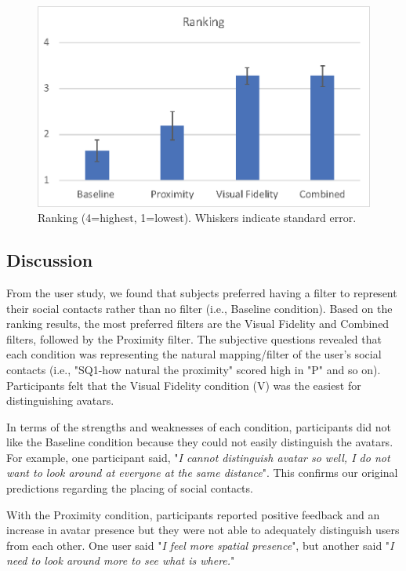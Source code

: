 \begin{figure}[ht]
    \centering
    \includegraphics[width=0.8\linewidth]{images/mgia17/analysis-images-04.eps}
    \caption{Ranking (4=highest, 1=lowest). Whiskers indicate standard error.}
    \label{fig:contacts:ranking}
\end{figure}

\subsection{Discussion}

From the user study, we found that subjects preferred having a filter to represent their social contacts rather than no filter (i.e., Baseline condition). Based on the ranking results, the most preferred filters are the Visual Fidelity and Combined filters, followed by the Proximity filter.
The subjective questions revealed that each condition was representing the natural mapping/filter of the user's social contacts (i.e., "SQ1-how natural the proximity" scored high in "P" and so on). Participants felt that the Visual Fidelity condition (V) was the easiest for distinguishing avatars.

In terms of the strengths and weaknesses of each condition, participants did not like the Baseline condition because they could not easily distinguish the avatars. For example, one participant said, "\textit{I cannot distinguish avatar so well, I do not want to look around at everyone at the same distance}". This confirms our original predictions regarding the placing of social contacts.

With the Proximity condition, participants reported positive feedback and an increase in avatar presence but they were not able to adequately distinguish users from each other.  One user said "\textit{I feel more spatial presence}", but another said "\textit{I need to look around more to see what is where.}"

